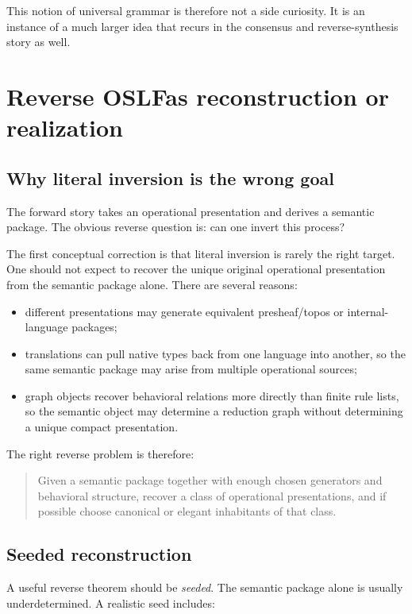\documentclass[11pt]{article}
\newcommand{\OSLF}{OSLF}
\begin{document}
This notion of universal grammar is therefore not a side curiosity. It is an instance of a much larger idea that recurs in the consensus and reverse-synthesis story as well.

\section{Reverse \OSLF as reconstruction or realization}

\subsection{Why literal inversion is the wrong goal}

The forward story takes an operational presentation and derives a semantic package. The obvious reverse question is: can one invert this process?

The first conceptual correction is that literal inversion is rarely the right target. One should not expect to recover the unique original operational presentation from the semantic package alone. There are several reasons:

\begin{itemize}
  \item different presentations may generate equivalent presheaf/topos or internal-language packages;
  \item translations can pull native types back from one language into another, so the same semantic package may arise from multiple operational sources;
  \item graph objects recover behavioral relations more directly than finite rule lists, so the semantic object may determine a reduction graph without determining a unique compact presentation.
\end{itemize}

The right reverse problem is therefore:

\begin{quote}
Given a semantic package together with enough chosen generators and behavioral structure, recover a class of operational presentations, and if possible choose canonical or elegant inhabitants of that class.
\end{quote}

\subsection{Seeded reconstruction}

A useful reverse theorem should be \emph{seeded}. The semantic package alone is usually underdetermined. A realistic seed includes:
\end{document}
